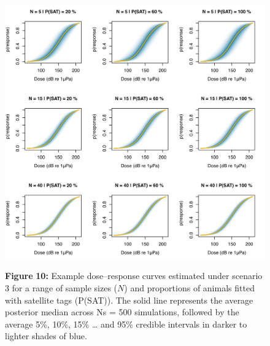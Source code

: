 \documentclass[
]{article}
\begin{document}
\begin{figure}

{\centering \includegraphics[width=1\linewidth]{fig/fig_doseresponse_S3} 

}

\textbf{Figure }{\textbf{10:} \hypertarget{fig10}{}Example dose--response curves estimated under scenario 3 for a range of sample sizes (\(N\)) and proportions of animals fitted with satellite tags (P(SAT)). The solid line represents the average posterior median across Ns = 500 simulations, followed by the average 5\%, 10\%, 15\% \ldots{} and 95\% credible intervals in darker to lighter shades of blue.}\label{fig:unnamed-chunk-9}
\end{figure}
\end{document}
